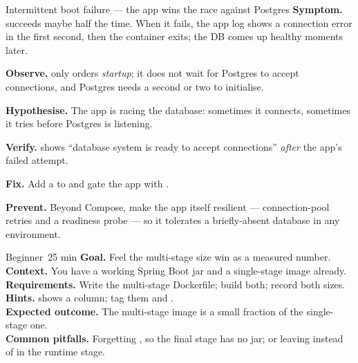 \begin{debuglab}{Intermittent boot failure --- the app wins the race against Postgres}
\textbf{Symptom.}  succeeds maybe half the time. When it fails, the app log shows a connection error in the first second, then the container exits; the DB comes up healthy moments later.

\begin{tickcheck}
  \item \textbf{Observe.}  only orders \emph{startup}; it does not wait for Postgres to accept connections, and Postgres needs a second or two to initialise.
  \item \textbf{Hypothesise.} The app is racing the database: sometimes it connects, sometimes it tries before Postgres is listening.
  \item \textbf{Verify.}  shows ``database system is ready to accept connections'' \emph{after} the app's failed attempt.
  \item \textbf{Fix.} Add a  to  and gate the app with .
  \item \textbf{Prevent.} Beyond Compose, make the app itself resilient --- connection-pool retries and a readiness probe --- so it tolerates a briefly-absent database in any environment.
\end{tickcheck}
\end{debuglab}


\begin{minilab}{Beginner}{~25 min}
\textbf{Goal.} Feel the multi-stage size win as a measured number.\\
\textbf{Context.} You have a working Spring Boot jar and a single-stage image already.\\
\textbf{Requirements.} Write the multi-stage Dockerfile; build both; record both sizes.\\
\textbf{Hints.}  shows a  column; tag them  and .\\
\textbf{Expected outcome.} The multi-stage image is a small fraction of the single-stage one.\\
\textbf{Common pitfalls.} Forgetting , so the final stage has no jar; or leaving  instead of  in the runtime stage.
\end{minilab}

